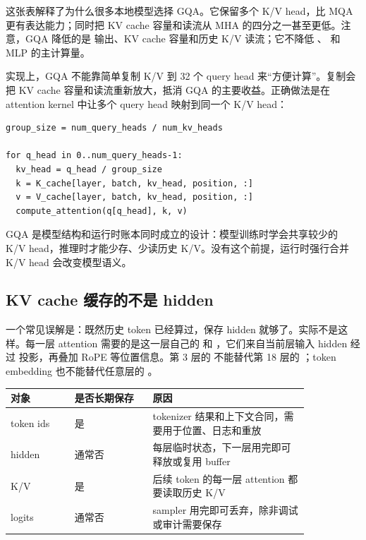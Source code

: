 这张表解释了为什么很多本地模型选择 GQA。它保留多个 K/V head，比 MQA 更有表达能力；同时把 KV cache 容量和读流从 MHA 的四分之一甚至更低。注意，GQA 降低的是  输出、KV cache 容量和历史 K/V 读流；它不降低 、 和 MLP 的主计算量。

实现上，GQA 不能靠简单复制 K/V 到 32 个 query head 来“方便计算”。复制会把 KV cache 容量和读流重新放大，抵消 GQA 的主要收益。正确做法是在 attention kernel 中让多个 query head 映射到同一个 K/V head：

\begin{lstlisting}[numbers=none,caption={GQA head 映射不能靠物理复制糊弄}]
group_size = num_query_heads / num_kv_heads

for q_head in 0..num_query_heads-1:
  kv_head = q_head / group_size
  k = K_cache[layer, batch, kv_head, position, :]
  v = V_cache[layer, batch, kv_head, position, :]
  compute_attention(q[q_head], k, v)
\end{lstlisting}

\begin{keyidea}
GQA 是模型结构和运行时账本同时成立的设计：模型训练时学会共享较少的 K/V head，推理时才能少存、少读历史 K/V。没有这个前提，运行时强行合并 K/V head 会改变模型语义。
\end{keyidea}

\subsection{KV cache 缓存的不是 hidden}

一个常见误解是：既然历史 token 已经算过，保存 hidden 就够了。实际不是这样。每一层 attention 需要的是这一层自己的  和 ，它们来自当前层输入 hidden 经过  投影，再叠加 RoPE 等位置信息。第 3 层的  不能替代第 18 层的 ；token embedding 也不能替代任意层的 。

\begin{center}
\begin{tabular}{p{0.18\linewidth}p{0.22\linewidth}p{0.44\linewidth}}
\toprule
对象 & 是否长期保存 & 原因 \\
\midrule
token ids & 是 & tokenizer 结果和上下文合同，需要用于位置、日志和重放 \\
hidden & 通常否 & 每层临时状态，下一层用完即可释放或复用 buffer \\
K/V & 是 & 后续 token 的每一层 attention 都要读取历史 K/V \\
logits & 通常否 & sampler 用完即可丢弃，除非调试或审计需要保存 \\
\bottomrule
\end{tabular}
\end{center}

